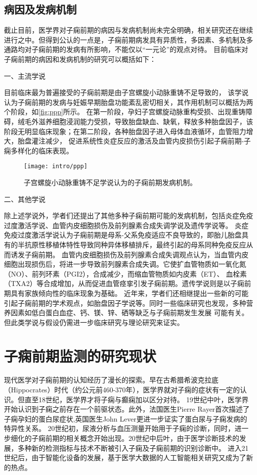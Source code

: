 \subsection{病因及发病机制}
截止目前，医学界对子痫前期的病因与发病机制尚未完全明确，相关研究还在继续进行之中。但得到公认的一点是，子痫前期病发具有异质性，多因素、多机制及多通路均对子痫前期的发病有所影响，不能仅以“一元论”的观点对待。
目前临床对子痫前期的病因和发病机制的研究可以概括如下：

一、主流学说

目前临床最为普遍接受的子痫前期是由子宫螺旋小动脉重铸不足导致的，
该学说认为子痫前期的发病与妊娠早期胎盘功能紊乱密切相关\cite{OAG9,Duvekot2010,2009ix}，其作用机制可以概括为两个阶段，如\autoref{fig:ppp}所示。
在第一阶段，孕妇子宫螺旋动脉重构受损、出现重铸障碍，绒毛外滋养细胞浸润能力受损，导致胎盘缺血、缺氧，释放多种胎盘因子，该阶段无明显临床现象；在第二阶段，各种胎盘因子进入母体血液循环，血管阻力增大，胎盘灌注减少，
促进系统性炎症反应的激活及血管内皮损伤引起子痫前期-子痫多样化的临床表现。
\begin{figure}[htbp]
    \centering
    \texttt{[image: intro/ppp]}
    \caption[子宫螺旋小动脉重铸不足学说认为的子痫前期发病机制]{\label{fig:ppp}子宫螺旋小动脉重铸不足学说认为的子痫前期发病机制\cite{Duvekot2010,2009ix}。}
\end{figure}

二、其他学说

除上述学说外，学者们还提出了其他多种子痫前期可能的发病机制，包括炎症免疫过度激活学说、血管内皮细胞损伤及前列腺素合成失调学说及遗传学说等。
炎症免疫过度激活学说认为子痫前期是母系-父系免疫适应不良导致的，即胎儿胎盘具有的半抗原性移植体特性导致同种异体移植排斥，最终引起的母系同种免疫反应从而诱发子痫前期\cite{Sibai2005,OAG9,Shi2006,Moffett2002}。
血管内皮细胞损伤及前列腺素合成失调观点认为，当血管内皮细胞出现损伤后，将进一步导致前列腺素合成失调\cite{OAG9,Sibai2005}。它使扩血管物质如一氧化氮（NO）、前列环素（PGI2），合成减少，而缩血管物质如内皮素（ET）、
血栓素（TXA2）等合成增加，从而促进血管痉挛引发子痫前期。遗传学说则是以子痫前期具有家族倾向性的临床现象为基础\cite{OAG9,Sibai2005,Ge2013}。
近年来，学者们还相继提出一些新的可能引起子痫前期的学术观点，如胎盘因子学说\cite{Shi2006}等。同时一些临床研究也发现，多种营养因素如低白蛋白血症、钙、镁、锌、硒等缺乏与子痫前期发生发展
可能有关\cite{OAG9}。但此类学说与假设仍需进一步临床研究与理论研究来证实。
\raggedbottom

\section{子痫前期监测的研究现状}
现代医学对子痫前期的认知经历了漫长的探索\cite{BJOG2016}。早在古希腊希波克拉底（Hippocrates）时代（约公元前460-370年），医学界就对子痫的症状有一定的认识。但直至18世纪，医学界才将子痫与癫痫加以区分对待。
19世纪中叶，医学界开始认识到子痫之前存在一个前驱状态。此外，法国医生Pierre Rayer首次描述了子痫孕妇的蛋白尿症状,英国医生John Lever更进一步证实了蛋白尿与子痫发病的特异性关系。
20世纪初，尿液分析与血压测量开始用于子痫的诊断，同时，进一步细化的子痫前期的相关概念开始出现。20世纪中后叶，由于医学诊断技术的发展，多种新的检测指标与技术不断被引入子痫及子痫前期的识别诊断中。
进入21世纪后，由于智能化设备的发展，基于医学大数据的人工智能相关研究又成为了新的热点。

